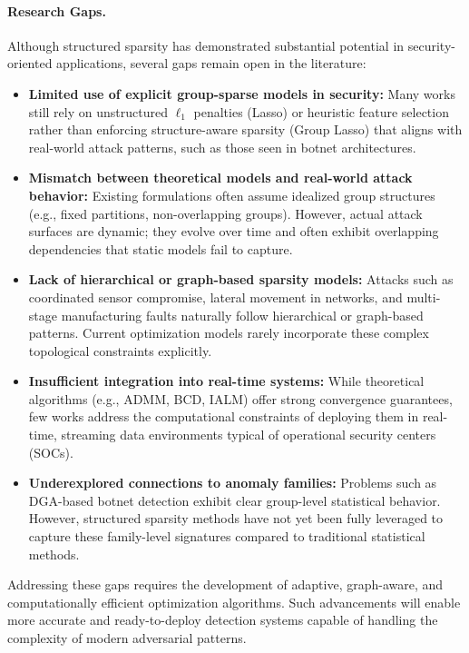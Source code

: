 \documentclass[12pt]{article}
\begin{document}
\paragraph{Research Gaps.}
Although structured sparsity has demonstrated substantial potential in security-oriented applications, several gaps remain open in the literature:

\begin{itemize}
    \item \textbf{Limited use of explicit group-sparse models in security:}
    Many works still rely on unstructured $\ell_1$ penalties (Lasso) or heuristic feature selection rather than enforcing structure-aware sparsity (Group Lasso) that aligns with real-world attack patterns, such as those seen in botnet architectures.

    \item \textbf{Mismatch between theoretical models and real-world attack behavior:}
    Existing formulations often assume idealized group structures (e.g., fixed partitions, non-overlapping groups). However, actual attack surfaces are dynamic; they evolve over time and often exhibit overlapping dependencies that static models fail to capture.

    \item \textbf{Lack of hierarchical or graph-based sparsity models:}
    Attacks such as coordinated sensor compromise, lateral movement in networks, and multi-stage manufacturing faults naturally follow hierarchical or graph-based patterns. Current optimization models rarely incorporate these complex topological constraints explicitly.

    \item \textbf{Insufficient integration into real-time systems:}
    While theoretical algorithms (e.g., ADMM, BCD, IALM) offer strong convergence guarantees, few works address the computational constraints of deploying them in real-time, streaming data environments typical of operational security centers (SOCs).

    \item \textbf{Underexplored connections to anomaly families:}
    Problems such as DGA-based botnet detection exhibit clear group-level statistical behavior. However, structured sparsity methods have not yet been fully leveraged to capture these family-level signatures compared to traditional statistical methods.
\end{itemize}
Addressing these gaps requires the development of adaptive, graph-aware, and computationally efficient optimization algorithms. Such advancements will enable more accurate and ready-to-deploy detection systems capable of handling the complexity of modern adversarial patterns.
\end{document}

